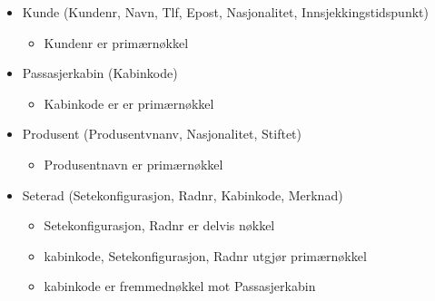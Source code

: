 \documentclass[a4paper,12pt]{article}
\begin{document}
\begin{itemize}
\item Kunde (Kundenr, Navn, Tlf, Epost, Nasjonalitet, Innsjekkingstidspunkt)
\begin{itemize}
\item Kundenr er primærnøkkel
\end{itemize}

\item Passasjerkabin (Kabinkode)
\begin{itemize}
\item Kabinkode er er primærnøkkel
\end{itemize}

\item Produsent (Produsentvnanv, Nasjonalitet, Stiftet)
\begin{itemize}
\item Produsentnavn er primærnøkkel
\end{itemize}

\item Seterad (Setekonfigurasjon, Radnr, Kabinkode, Merknad)
\begin{itemize}
\item Setekonfigurasjon, Radnr er delvis nøkkel
\item kabinkode, Setekonfigurasjon, Radnr utgjør primærnøkkel
\item kabinkode er fremmednøkkel mot Passasjerkabin 
\end{itemize}

\end{itemize}
\end{document}
